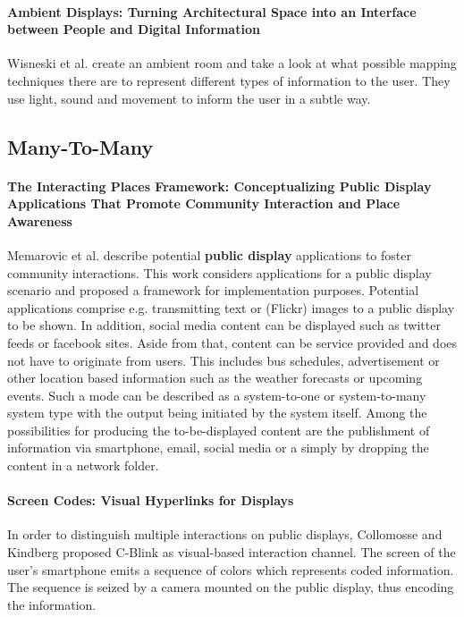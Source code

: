 \paragraph{Ambient Displays: Turning Architectural Space into an Interface between People and Digital Information}
Wisneski et al. \cite{wisneski_ambient_1998} create an ambient room and take a look at what possible mapping techniques there are to represent different types of information to the user. They use light, sound and movement to inform the user in a subtle way.

\subsection{Many-To-Many}

\paragraph{The Interacting Places Framework: Conceptualizing Public Display Applications That Promote Community Interaction and Place Awareness}
Memarovic et al. \cite{memarovic_places} describe potential \textbf{public display} applications to foster community interactions.
This work considers applications for a public display scenario and proposed a framework for implementation purposes.
Potential applications comprise e.g. transmitting text or (Flickr) images to a public display to be shown.
In addition, social media content can be displayed such as twitter feeds or facebook sites.
Aside from that, content can be service provided and does not have to originate from users.
This includes bus schedules, advertisement or other location based information such as the weather forecasts or upcoming events.
Such a mode can be described as a system-to-one or system-to-many system type with the output being initiated by the system itself.
Among the possibilities for producing the to-be-displayed content are the publishment of information via smartphone, email, social media or a simply by dropping the content in a network folder.

\paragraph{Screen Codes: Visual Hyperlinks for Displays}
In order to distinguish multiple interactions on public displays, Collomosse and Kindberg \cite{Collomosse_ScreenCodes} proposed C-Blink as visual-based interaction channel. The screen of the user’s smartphone emits a sequence of colors which represents coded information. The sequence is seized by a camera mounted on the public display, thus encoding the information.

